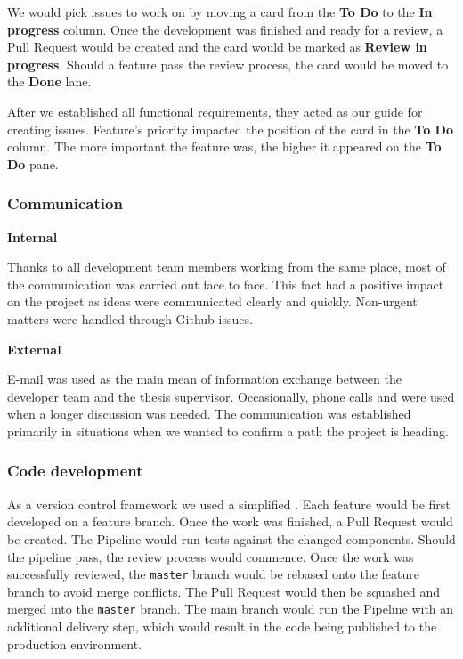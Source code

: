 We would pick issues to work on by moving a card from the \textbf{To Do} to the \textbf{In progress} column. Once the development was finished and ready for a review, a Pull Request would be created and the card would be marked as \textbf{Review in progress}. Should a feature pass the review process, the card would be moved to the \textbf{Done} lane.

\medskip 

After we established all functional requirements, they acted as our guide for creating issues. Feature's priority impacted the position of the card in the \textbf{To Do} column. The more important the feature was, the higher it appeared on the \textbf{To Do} pane.

\subsubsection{Communication}

\textbf{Internal}

Thanks to all development team members working from the same place, most of the communication was carried out face to face. This fact had a positive impact on the project as ideas were communicated clearly and quickly. Non-urgent matters were handled through Github issues.

\medskip

\textbf{External}

E-mail was used as the main mean of information exchange between the developer team and the thesis supervisor. Occasionally, phone calls and  were used when a longer discussion was needed. The communication was established primarily in situations when we wanted to confirm a path the project is heading.


\subsubsection{Code development}

As a version control framework we used a simplified . Each feature would be first developed on a feature branch. Once the work was finished, a Pull Request would be created. The Pipeline would run tests against the changed components. Should the pipeline pass, the review process would commence. Once the work was successfully reviewed, the \texttt{master} branch would be rebased onto the feature branch to avoid merge conflicts. The Pull Request would then be squashed and merged into the \texttt{master} branch. The main branch would run the Pipeline with an additional delivery step, which would result in the code being published to the production environment.




